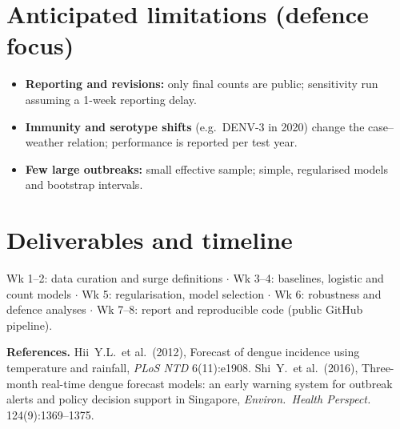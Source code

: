 \documentclass[10pt,a4paper]{article}
\begin{document}
\section{Anticipated limitations (defence focus)}
\begin{itemize}
  \item \textbf{Reporting and revisions:} only final counts are public; sensitivity run assuming a 1-week reporting delay.
  \item \textbf{Immunity and serotype shifts} (e.g.\ DENV-3 in 2020) change the case--weather relation; performance
        is reported per test year.
  \item \textbf{Few large outbreaks:} small effective sample; simple, regularised models and bootstrap intervals.\end{itemize}

\section{Deliverables and timeline}
Wk 1--2: data curation and surge definitions \;$\cdot$\; Wk 3--4: baselines, logistic and count models
\;$\cdot$\; Wk 5: regularisation, model selection \;$\cdot$\; Wk 6: robustness and defence analyses
\;$\cdot$\; Wk 7--8: report and reproducible code (public GitHub pipeline).

\vspace{2pt}
{\footnotesize \textbf{References.}
Hii~Y.L.\ et al.\ (2012), Forecast of dengue incidence using temperature and rainfall, \emph{PLoS NTD} 6(11):e1908.
Shi~Y.\ et al.\ (2016), Three-month real-time dengue forecast models: an early warning system for outbreak alerts
and policy decision support in Singapore, \emph{Environ.\ Health Perspect.} 124(9):1369--1375.\par}
\end{document}

